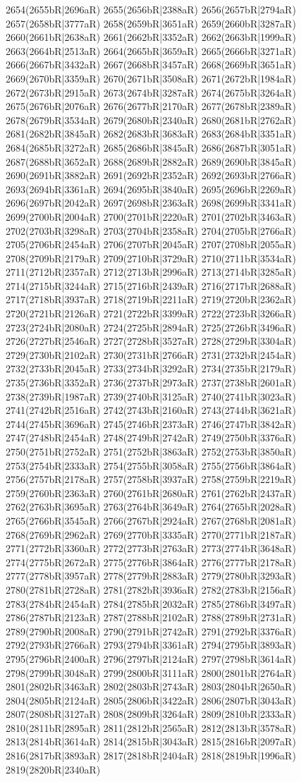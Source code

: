 2654(2655bR|2696aR) 2655(2656bR|2388aR) 2656(2657bR|2794aR) 2657(2658bR|3777aR) 2658(2659bR|3651aR) 2659(2660bR|3287aR) 2660(2661bR|2638aR) 2661(2662bR|3352aR) 2662(2663bR|1999aR) 2663(2664bR|2513aR) 2664(2665bR|3659aR) 2665(2666bR|3271aR) 2666(2667bR|3432aR) 2667(2668bR|3457aR) 2668(2669bR|3651aR) 2669(2670bR|3359aR) 2670(2671bR|3508aR) 2671(2672bR|1984aR) 2672(2673bR|2915aR) 2673(2674bR|3287aR) 2674(2675bR|3264aR) 2675(2676bR|2076aR) 2676(2677bR|2170aR) 2677(2678bR|2389aR) 2678(2679bR|3534aR) 2679(2680bR|2340aR) 2680(2681bR|2762aR) 2681(2682bR|3845aR) 2682(2683bR|3683aR) 2683(2684bR|3351aR) 2684(2685bR|3272aR) 2685(2686bR|3845aR) 2686(2687bR|3051aR) 2687(2688bR|3652aR) 2688(2689bR|2882aR) 2689(2690bR|3845aR) 2690(2691bR|3882aR) 2691(2692bR|2352aR) 2692(2693bR|2766aR) 2693(2694bR|3361aR) 2694(2695bR|3840aR) 2695(2696bR|2269aR) 2696(2697bR|2042aR) 2697(2698bR|2363aR) 2698(2699bR|3341aR) 2699(2700bR|2004aR) 2700(2701bR|2220aR) 2701(2702bR|3463aR) 2702(2703bR|3298aR) 2703(2704bR|2358aR) 2704(2705bR|2766aR) 2705(2706bR|2454aR) 2706(2707bR|2045aR) 2707(2708bR|2055aR) 2708(2709bR|2179aR) 2709(2710bR|3729aR) 2710(2711bR|3534aR) 2711(2712bR|2357aR) 2712(2713bR|2996aR) 2713(2714bR|3285aR) 2714(2715bR|3244aR) 2715(2716bR|2439aR) 2716(2717bR|2688aR) 2717(2718bR|3937aR) 2718(2719bR|2211aR) 2719(2720bR|2362aR) 2720(2721bR|2126aR) 2721(2722bR|3399aR) 2722(2723bR|3266aR) 2723(2724bR|2080aR) 2724(2725bR|2894aR) 2725(2726bR|3496aR) 2726(2727bR|2546aR) 2727(2728bR|3527aR) 2728(2729bR|3304aR) 2729(2730bR|2102aR) 2730(2731bR|2766aR) 2731(2732bR|2454aR) 2732(2733bR|2045aR) 2733(2734bR|3292aR) 2734(2735bR|2179aR) 2735(2736bR|3352aR) 2736(2737bR|2973aR) 2737(2738bR|2601aR) 2738(2739bR|1987aR) 2739(2740bR|3125aR) 2740(2741bR|3023aR) 2741(2742bR|2516aR) 2742(2743bR|2160aR) 2743(2744bR|3621aR) 2744(2745bR|3696aR) 2745(2746bR|2373aR) 2746(2747bR|3842aR) 2747(2748bR|2454aR) 2748(2749bR|2742aR) 2749(2750bR|3376aR) 2750(2751bR|2752aR) 2751(2752bR|3863aR) 2752(2753bR|3850aR) 2753(2754bR|2333aR) 2754(2755bR|3058aR) 2755(2756bR|3864aR) 2756(2757bR|2178aR) 2757(2758bR|3937aR) 2758(2759bR|2219aR) 2759(2760bR|2363aR) 2760(2761bR|2680aR) 2761(2762bR|2437aR) 2762(2763bR|3695aR) 2763(2764bR|3649aR) 2764(2765bR|2028aR) 2765(2766bR|3545aR) 2766(2767bR|2924aR) 2767(2768bR|2081aR) 2768(2769bR|2962aR) 2769(2770bR|3335aR) 2770(2771bR|2187aR) 2771(2772bR|3360aR) 2772(2773bR|2763aR) 2773(2774bR|3648aR) 2774(2775bR|2672aR) 2775(2776bR|3864aR) 2776(2777bR|2178aR) 2777(2778bR|3957aR) 2778(2779bR|2883aR) 2779(2780bR|3293aR) 2780(2781bR|2728aR) 2781(2782bR|3936aR) 2782(2783bR|2156aR) 2783(2784bR|2454aR) 2784(2785bR|2032aR) 2785(2786bR|3497aR) 2786(2787bR|2123aR) 2787(2788bR|2102aR) 2788(2789bR|2731aR) 2789(2790bR|2008aR) 2790(2791bR|2742aR) 2791(2792bR|3376aR) 2792(2793bR|2766aR) 2793(2794bR|3361aR) 2794(2795bR|3893aR) 2795(2796bR|2400aR) 2796(2797bR|2124aR) 2797(2798bR|3614aR) 2798(2799bR|3048aR) 2799(2800bR|3111aR) 2800(2801bR|2764aR) 2801(2802bR|3463aR) 2802(2803bR|2743aR) 2803(2804bR|2650aR) 2804(2805bR|2124aR) 2805(2806bR|3422aR) 2806(2807bR|3043aR) 2807(2808bR|3127aR) 2808(2809bR|3264aR) 2809(2810bR|2333aR) 2810(2811bR|2895aR) 2811(2812bR|2565aR) 2812(2813bR|3578aR) 2813(2814bR|3614aR) 2814(2815bR|3043aR) 2815(2816bR|2097aR) 2816(2817bR|3893aR) 2817(2818bR|2404aR) 2818(2819bR|1996aR) 2819(2820bR|2340aR) 